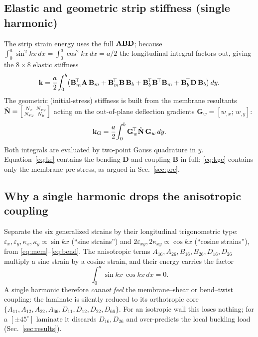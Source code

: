 \subsection{Elastic and geometric strip stiffness (single harmonic)}\label{sec:kg}
The strip strain energy uses the full $\mathbf{ABD}$; because $\int_0^a\sin^2kx\,dx=\int_0^a\cos^2kx\,dx=a/2$ the
longitudinal integral factors out, giving the $8\times8$ elastic stiffness
\begin{equation}
\mathbf{k}=\frac a2\!\int_0^b\!\big(\mathbf B_m^{\!\top}\mathbf A\,\mathbf B_m
+\mathbf B_m^{\!\top}\mathbf B\,\mathbf B_b+\mathbf B_b^{\!\top}\mathbf B^{\!\top}\mathbf B_m
+\mathbf B_b^{\!\top}\mathbf D\,\mathbf B_b\big)\,dy .
\label{eq:ke}
\end{equation}
The geometric (initial-stress) stiffness is built from the membrane resultants
$\hat{\mathbf{N}}=\left[\begin{smallmatrix}N_x&N_{xy}\\N_{xy}&N_y\end{smallmatrix}\right]$ acting on the out-of-plane
deflection gradients $\mathbf G_w=[w_{,x};\,w_{,y}]$:
\begin{equation}
\mathbf{k}_{\mathrm{G}}=\frac a2\!\int_0^b \mathbf G_w^{\!\top}\hat{\mathbf{N}}\,\mathbf G_w\,dy .
\label{eq:kge}
\end{equation}
Both integrals are evaluated by two-point Gauss quadrature in $y$. Equation~\eqref{eq:ke} contains the
bending $\mathbf D$ and coupling $\mathbf B$ in full; \eqref{eq:kge} contains only the membrane pre-stress,
as argued in Sec.~\ref{sec:pre}.

\subsection{Why a single harmonic drops the anisotropic coupling}\label{sec:drop}
Separate the six generalized strains by their longitudinal trigonometric type:
$\varepsilon_x,\varepsilon_y,\kappa_x,\kappa_y\!\propto\!\sin kx$ (``sine strains'') and
$2\varepsilon_{xy},2\kappa_{xy}\!\propto\!\cos kx$ (``cosine strains''), from \eqref{eq:mem}--\eqref{eq:bend}.
The anisotropic terms $A_{16},A_{26},B_{16},B_{26},D_{16},D_{26}$ multiply a sine strain by a cosine strain,
and their energy carries the factor
\begin{equation}
\int_0^a \sin kx\,\cos kx\,dx=0 .
\label{eq:orth}
\end{equation}
A single harmonic therefore \emph{cannot feel} the membrane--shear or bend--twist coupling: the laminate is
silently reduced to its orthotropic core $\{A_{11},A_{12},A_{22},A_{66},D_{11},D_{12},D_{22},D_{66}\}$.
For an isotropic wall this loses nothing; for a $[\pm45^\circ]$ laminate it discards $D_{16},D_{26}$ and
over-predicts the local buckling load (Sec.~\ref{sec:results}).

